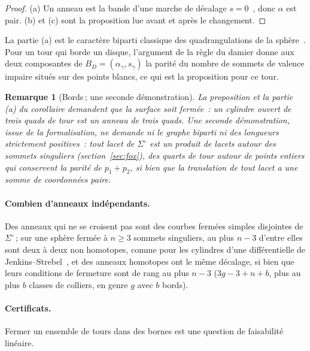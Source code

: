 \documentclass[11pt,a4paper]{article}
\newtheorem{remark}{Remarque}
\newcommand{\shift}{s}
\begin{document}
\begin{proof}
(a) Un anneau est la bande d'une marche de décalage $\shift =
0$~\cite[prop.~2]{gardent2026loops}, donc $\alpha$ est pair. (b) et (c) sont
la proposition lue avant et après le changement.
\end{proof}

La partie (a) est le caractère biparti classique des quadrangulations de la
sphère~\cite[lemme~3.1]{kaiser2015colouring}. Pour un tour qui borde un
disque, l'argument de la règle du damier donne aux deux composantes de $B_D =
(\alpha_\gamma, \shift_\gamma)$ la parité du nombre de sommets de valence
impaire situés sur des points blancs, ce qui est la proposition pour ce tour.

\begin{remark}[Bords\,; une seconde démonstration]\label{rem:borders}
La proposition et la partie (a) du corollaire demandent que la surface soit
fermée~: un cylindre ouvert de trois quads de tour est un anneau de trois
quads. Une seconde démonstration, issue de la formalisation, ne demande ni le
graphe biparti ni des longueurs strictement positives~: tout lacet de
$\Sigma^\circ$ est un produit de lacets autour des sommets singuliers
(section~\ref{sec:fox}), des quarts de tour autour de points entiers qui
conservent la parité de $p_1 + p_2$, si bien que la translation de tout lacet
a une somme de coordonnées paire.
\end{remark}

\paragraph{Combien d'anneaux indépendants.}
Des anneaux qui ne se croisent pas sont des courbes fermées simples disjointes
de $\Sigma^\circ$\,; sur une sphère fermée à $n \ge 3$ sommets singuliers, au
plus $n - 3$ d'entre elles sont deux à deux non homotopes, comme pour les
cylindres d'une différentielle de
Jenkins--Strebel~\cite{strebel1984quadratic}, et des anneaux homotopes ont le
même décalage, si bien que leurs conditions de fermeture sont de rang au plus
$n - 3$ ($3g - 3 + n + b$, plus au plus $b$ classes de colliers, en genre $g$
avec $b$ bords).

\paragraph{Certificats.}
Fermer un ensemble de tours dans des bornes est une question de faisabilité
linéaire.
\end{document}

